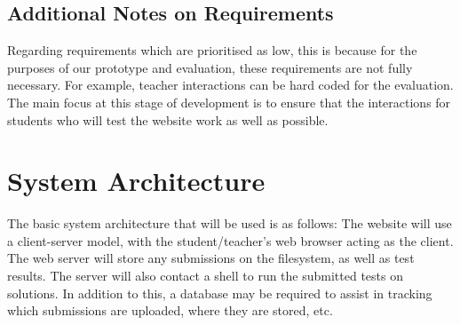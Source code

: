 \documentclass[a4paper,11pt]{report}
\begin{document}
\subsection{Additional Notes on Requirements}
Regarding requirements which are prioritised as low, this is because for the purposes of our prototype and evaluation, these requirements are not fully necessary. For example, teacher interactions can be hard coded for the evaluation. The main focus at this stage of development is to ensure that the interactions for students who will test the website work as well as possible.

\section{System Architecture}
\begin{figure}[h]
\centering
{}
\end{figure}
The basic system architecture that will be used is as follows: The website will use a client-server model, with the student/teacher's web browser acting as the client. The web server will store any submissions on the filesystem, as well as test results. The server will also contact a shell to run the submitted tests on solutions. In addition to this, a database may be required to assist in tracking which submissions are uploaded, where they are stored, etc.
\end{document}
